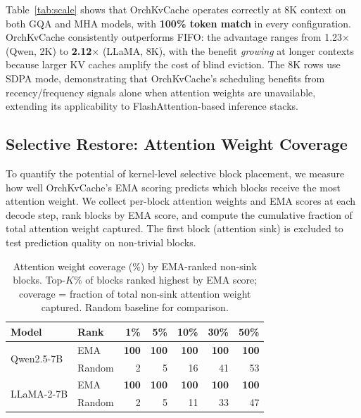 \documentclass[conference]{IEEEtran}
\begin{document}
Table~\ref{tab:scale} shows that OrchKvCache operates correctly at 8K context on both GQA and MHA models, with \textbf{100\% token match} in every configuration.  OrchKvCache consistently outperforms FIFO: the advantage ranges from 1.23$\times$ (Qwen, 2K) to \textbf{2.12$\times$} (LLaMA, 8K), with the benefit \emph{growing} at longer contexts because larger KV caches amplify the cost of blind eviction.  The 8K rows use SDPA mode, demonstrating that OrchKvCache's scheduling benefits from recency/frequency signals alone when attention weights are unavailable, extending its applicability to FlashAttention-based inference stacks.

\subsection{Selective Restore: Attention Weight Coverage}
\label{sec:selective-restore}

To quantify the potential of kernel-level selective block placement, we measure how well OrchKvCache's EMA scoring predicts which blocks receive the most attention weight. We collect per-block attention weights and EMA scores at each decode step, rank blocks by EMA score, and compute the cumulative fraction of total attention weight captured. The first block (attention sink) is excluded to test prediction quality on non-trivial blocks.

\begin{table}[t]
\centering
\caption{Attention weight coverage (\%) by EMA-ranked non-sink blocks.  Top-$K$\% of blocks ranked highest by EMA score; coverage = fraction of total non-sink attention weight captured.  Random baseline for comparison.}
\label{tab:selective}
\footnotesize
\setlength{\tabcolsep}{9pt}
\begin{tabular}{@{}llrrrrr@{}}
\toprule
Model & Rank & 1\% & 5\% & 10\% & 30\% & 50\% \\
\midrule
\multirow{2}{*}{Qwen2.5-7B}
  & EMA    & \textbf{100} & \textbf{100} & \textbf{100} & \textbf{100} & \textbf{100} \\
  & Random & 2 & 5 & 16 & 41 & 53 \\
\midrule
\multirow{2}{*}{LLaMA-2-7B}
  & EMA    & \textbf{100} & \textbf{100} & \textbf{100} & \textbf{100} & \textbf{100} \\
  & Random & 2 & 5 & 11 & 33 & 47 \\
\bottomrule
\end{tabular}
\end{table}
\end{document}
